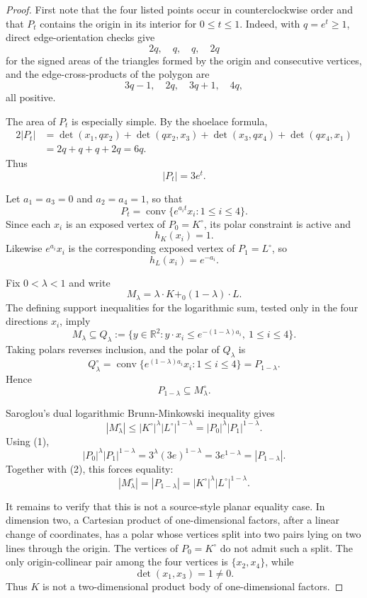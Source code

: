 \documentclass[11pt]{article}
\newcommand{\R}{\mathbb R}
\newcommand{\conv}{\operatorname{conv}}
\newcommand{\polar}{^\circ}
\begin{document}
\begin{proof}
First note that the four listed points occur in counterclockwise order and
that \(P_t\) contains the origin in its interior for \(0\leq t\leq1\).  Indeed,
with \(q=e^t\geq1\), direct edge-orientation checks give
\[
2q,\quad q,\quad q,\quad 2q
\]
for the signed areas of the triangles formed by the origin and consecutive
vertices, and the edge-cross-products of the polygon are
\[
3q-1,\quad 2q,\quad 3q+1,\quad 4q,
\]
all positive.

The area of \(P_t\) is especially simple.  By the shoelace formula,
\[
\begin{aligned}
2|P_t|
&=\det(x_1,qx_2)+\det(qx_2,x_3)
  +\det(x_3,qx_4)+\det(qx_4,x_1)  \\
&=2q+q+q+2q=6q.
\end{aligned}
\]
Thus
\[
   |P_t|=3e^t.                                      \tag{1}
\]

Let \(a_1=a_3=0\) and \(a_2=a_4=1\), so that
\[
   P_t=\conv\{e^{a_i t}x_i:1\leq i\leq4\}.
\]
Since each \(x_i\) is an exposed vertex of \(P_0=K\polar\), its polar
constraint is active and
\[
   h_K(x_i)=1.
\]
Likewise \(e^{a_i}x_i\) is the corresponding exposed vertex of
\(P_1=L\polar\), so
\[
   h_L(x_i)=e^{-a_i}.
\]

Fix \(0<\lambda<1\) and write
\[
   M_\lambda=\lambda\cdot K+_0(1-\lambda)\cdot L.
\]
The defining support inequalities for the logarithmic sum, tested only in the
four directions \(x_i\), imply
\[
   M_\lambda
   \subseteq
   Q_\lambda
   :=
   \{y\in\R^2: y\cdot x_i\leq e^{-(1-\lambda)a_i},
       \ 1\leq i\leq4\}.
\]
Taking polars reverses inclusion, and the polar of \(Q_\lambda\) is
\[
   Q_\lambda\polar
   =
   \conv\{e^{(1-\lambda)a_i}x_i:1\leq i\leq4\}
   =
   P_{1-\lambda}.
\]
Hence
\[
   P_{1-\lambda}\subseteq M_\lambda\polar.           \tag{2}
\]

Saroglou's dual logarithmic Brunn-Minkowski inequality gives
\[
   |M_\lambda\polar|
   \leq |K\polar|^\lambda |L\polar|^{1-\lambda}
   = |P_0|^\lambda |P_1|^{1-\lambda}.
\]
Using (1),
\[
   |P_0|^\lambda |P_1|^{1-\lambda}
   =3^\lambda (3e)^{1-\lambda}
   =3e^{1-\lambda}
   =|P_{1-\lambda}|.
\]
Together with (2), this forces equality:
\[
   |M_\lambda\polar|=|P_{1-\lambda}|
   =|K\polar|^\lambda |L\polar|^{1-\lambda}.
\]

It remains to verify that this is not a source-style planar equality case.
In dimension two, a Cartesian product of one-dimensional factors, after a
linear change of coordinates, has a polar whose vertices split into two pairs
lying on two lines through the origin.  The vertices of \(P_0=K\polar\) do not
admit such a split.  The only origin-collinear pair among the four vertices is
\(\{x_2,x_4\}\), while
\[
   \det(x_1,x_3)=1\neq0.
\]
Thus \(K\) is not a two-dimensional product body of one-dimensional factors.


\end{proof}
\end{document}
